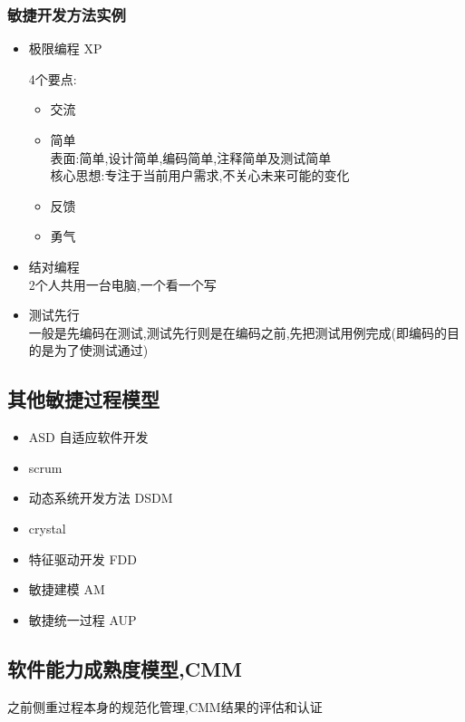 \documentclass[UTF8,a4paper]{ctexart}
\begin{document}
\subsubsection{敏捷开发方法实例}

\begin{itemize}
  \item 极限编程 XP

  4个要点:
  \begin{itemize}
    \item 交流
    \item 简单\\
    表面:简单,设计简单,编码简单,注释简单及测试简单\\
    核心思想:专注于当前用户需求,不关心未来可能的变化
    \item 反馈
    \item 勇气
  \end{itemize}

\item 结对编程\\
2个人共用一台电脑,一个看一个写

\item 测试先行\\
一般是先编码在测试,测试先行则是在编码之前,先把测试用例完成(即编码的目的是为了使测试通过)
\end{itemize}

\subsection{其他敏捷过程模型}

\begin{itemize}
  \item ASD 自适应软件开发
  \item scrum
  \item 动态系统开发方法 DSDM
  \item crystal
  \item 特征驱动开发 FDD
  \item 敏捷建模 AM
  \item 敏捷统一过程 AUP
\end{itemize}

\subsection{软件能力成熟度模型,CMM}
之前侧重过程本身的规范化管理,CMM结果的评估和认证
\end{document}
